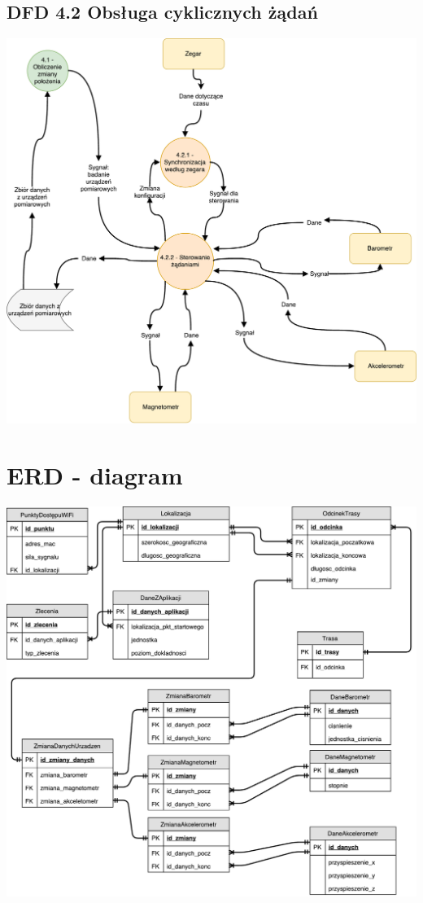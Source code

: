 \documentclass[11pt]{article}
\begin{document}
	\subsection{DFD 4.2 Obsługa cyklicznych żądań}
	\begin{center}
		\includegraphics[scale=0.55]{DFD42.pdf}
	\end{center}
	\newpage
	\section{ERD - diagram}
	\begin{center}
		\includegraphics[scale=0.65]{ERD.pdf}
	\end{center}
	\newpage
\end{document}
